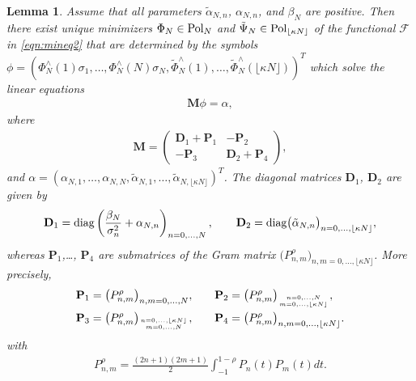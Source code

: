 \documentclass[a4paper, 10pt]{article}
\numberwithin{equation}{section}
\newtheorem{lem}[thm]{Lemma}
\theoremstyle{definition}
\begin{document}
\begin{lem}\label{prop:minsol}
Assume that all parameters $\tilde{\alpha}_{N,n}$, $\alpha_{N,n}$, and $\beta_N$ are positive. Then there exist unique minimizers $\Phi_N\in\textnormal{Pol}_{N}$ and $\tilde{\Psi}_N\in\textnormal{Pol}_{\lfloor\kappa N\rfloor}$ of the functional $\mathcal{F}$ in \eqref{eqn:mineq2} that are determined by the symbols $\phi=(\Phi_N^\wedge(1)\sigma_1,\ldots,\Phi_N^\wedge(N)\sigma_{N},\tilde{\Phi}_{N}^\wedge(1),\ldots,\tilde{\Phi}_{N}^\wedge(\lfloor\kappa N\rfloor))^T$ which solve the linear equations
\begin{align}\label{eqn:lineq1}
\mathbf{M}\phi=\alpha,
\end{align}
where 
\begin{align}
\mathbf{M}=\left(\begin{array}{c|c}\mathbf{D}_1+\mathbf{P}_1&-\mathbf{P}_2\\\hline-\mathbf{P}_3&\mathbf{D}_2+\mathbf{P}_4\end{array}\right),
\end{align}
and $\alpha=(\alpha_{N,1},\ldots,\alpha_{N,N},\tilde{\alpha}_{N,1},\ldots,\tilde{\alpha}_{N,\lfloor\kappa N\rfloor})^T$. The diagonal matrices $\mathbf{D}_1$, $\mathbf{D}_2$ are given by 
\begin{align}
\mathbf{D}_1=\textnormal{diag}\left(\frac{\beta_N}{\sigma_n^2}+\alpha_{N,n}\right)_{n=0,\ldots,N}, \qquad\mathbf{D}_2=\textnormal{diag}\big(\tilde{\alpha}_{N,n}\big)_{n=0,\ldots,\lfloor\kappa N\rfloor},
\end{align}
whereas $\mathbf{P}_1$,\ldots, $\mathbf{P}_4$ are submatrices of the Gram matrix $\big(P_{n,m}^\rho\big)_{n,m=0,\ldots, \lfloor\kappa N\rfloor}$. More precisely,
\begin{align}
\mathbf{P}_1=\big(P_{n,m}^\rho\big)_{n,m=0,\ldots,N},&\qquad \mathbf{P}_2=\big(P_{n,m}^\rho\big)_{n=0,\ldots,N\atop m=0,\ldots,\lfloor\kappa N\rfloor},
\\\mathbf{P}_3=\big(P_{n,m}^\rho\big)_{n=0,\ldots,\lfloor\kappa N\rfloor\atop m=0,\ldots,N},&\qquad\mathbf{P}_4=\big(P_{n,m}^\rho\big)_{n,m=0,\ldots,\lfloor\kappa N\rfloor}.
\end{align}
with
\begin{align}
P_{n,m}^\rho=\frac{(2n+1)(2m+1)}{2}\int_{-1}^{1-\rho}P_n(t)P_m(t)dt.
\end{align}
\end{lem}
\end{document}
